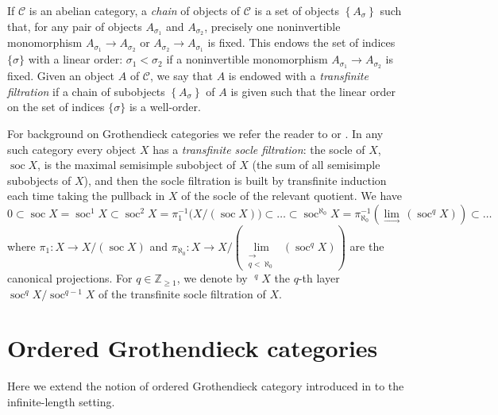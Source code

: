 \documentclass[11pt]{article}
\theoremstyle{plain}
\theoremstyle{nonumberplain}
\theoremstyle{plain}
\theoremstyle{nonumberplain}
\DeclareMathOperator{\soc}{\mathrm{soc}}
\DeclareMathOperator{\usoc}{\underline{\mathrm{soc}}}
\begin{document}
        If $\mathcal{C}$ is an abelian category, a \emph{chain} of
        objects of $\mathcal{C}$ is a set of objects
        $\left\{A_\sigma\right\}$ such that, for any pair of objects
        $A_{\sigma_1}$ and $A_{\sigma_2}$, precisely one noninvertible
        monomorphism $A_{\sigma_1}\to A_{\sigma_2}$ or
        $A_{\sigma_2}\to A_{\sigma_1}$ is fixed.  This endows the set
        of indices $\{\sigma\}$ with a linear order:
        $\sigma_1 <\sigma_2$ if a noninvertible monomorphism
        $A_{\sigma_1}\to A_{\sigma_2}$ is fixed.  Given an object $A$
        of $\mathcal{C}$, we say that $A$ is endowed with a
        \emph{transfinite filtration} if a chain of subobjects
        $\left\{A_\sigma\right\}$ of $A$ is given such that the linear
        order on the set of indices $\{\sigma\}$ is a well-order.


        For background on Grothendieck categories we refer the reader
        to \cite[$\S$1.1]{grk} or \cite[$\S$2.8]{groth}. In any such
        category every object $X$ has a \emph{transfinite socle
          filtration}: the socle of $X$, $\soc X$, is the maximal
        semisimple subobject of $X$ (the sum of all semisimple
        subobjects of $X$), and then the socle filtration is built by
        transfinite induction each time taking the pullback in $X$ of
        the socle of the relevant quotient.  We have
$$0 \subset \soc X=\soc^1 X \subset \soc^2 X =\pi_1^{-1}\big(X/(\soc X)\big)\subset\ldots\subset \soc^{\aleph_0}X=\pi^{-1}_{\aleph_0}\left(\lim\limits_{\longrightarrow}\,\left(\soc^qX\right)\right)\subset\ldots$$
where $\pi_1:X\to X/(\soc X)$ and
$\pi_{\aleph_0}:X\to
X/\left(\lim\limits_{\substack{{\longrightarrow}\\{q<\aleph_0}}}\,\left(\soc^qX\right)\right)$
are the canonical projections.  For $q \in\mathbb{Z}_{\geq 1}$, we denote by $\usoc^qX$ the $q$-th layer $\soc^q X/\soc^{q-1} X$ of the transfinite socle filtration of $X$.

\section{Ordered Grothendieck categories}\label{se.abs}


Here we extend the notion of ordered Grothendieck category introduced
in \cite{us2} to the infinite-length setting.
\end{document}
